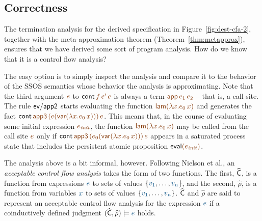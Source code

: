 \subsection{Correctness}

The termination analysis for the derived specification in
Figure~\ref{fig:dest-cfa-2}, together with the meta-approximation
theorem (Theorem~\ref{thm:metapprox}), ensures that we have derived
some sort of program analysis. How do we know that it is a control 
flow analysis? 

The easy option is to simply inspect the analysis and compare it to
the behavior of the SSOS semantics whose behavior the analysis is
approximating.  Note that the third argument $\lf{e}$ to ${\sf
  cont}\,\lf{f}\,\lf{e'}\,\lf{e}$ is always a term $\lf{{\sf
    app}\,e_1\,e_2}$ -- that is, a call site. The rule ${\sf ev/app2}$
starts evaluating the function $\lf{{\sf lam}(\lambda x.e_0\,x)}$ and
generates the fact ${\sf cont}\,\lf{\sf app3}\,\lf{(e({\sf
    var}(\lambda x.e_0\,x)))}\,\lf{e}$. This means that, in the course
of evaluating some initial expression $\lf{e_{\it init}}$, the
function $\lf{{\sf lam}(\lambda x.e_0\,x)}$ may be called from the
call site $\lf{e}$ only if ${\sf cont}\,\lf{\sf app3}\,\lf{(e_0({\sf
    var}(\lambda x.e_0\,x)))}\,\lf{e}$ appears in a saturated process
state that includes the persistent atomic proposition ${\sf
  eval}\lf{(e_{\it init})}$.


The analysis above is a bit informal, however. Following Nielson et
al., an {\it acceptable control flow analysis} takes the form of two
functions. The first, $\widehat{\sf C}$, is a function from
expressions $\obj{e}$ to sets of values $\{\obj{v_1},
\ldots,\obj{v_n}\}$, and the second, $\widehat{\rho}$, is a function
from variables $\obj{x}$ to sets of values $\{\obj{v_1},
\ldots,\obj{v_n}\}$. $\widehat{\sf C}$ and $\widehat{\rho}$ are said
to represent an acceptable control flow analysis for the expression
$\obj{e}$ if a coinductively defined judgment $(\widehat{\sf
  C},\widehat{\rho}) \models \obj{e}$ holds.

